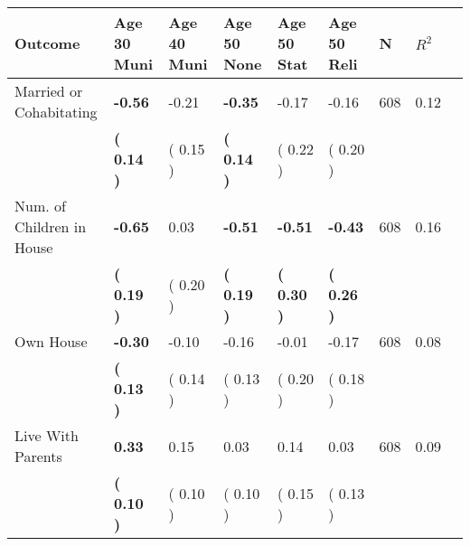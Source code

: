 \begin{tabular}{L{6.2cm} C{1.8cm} C{1.8cm} C{1.8cm} C{1.8cm} C{1.8cm} C{1.8cm} C{0.3cm} C{0.3cm}}
\toprule
 \textbf{Outcome} & \textbf{Age 30 Muni} & \textbf{Age 40 Muni} & \textbf{Age 50 None} & \textbf{Age 50 Stat} & \textbf{Age 50 Reli} & \textbf{N} & \textbf{$ R^2$} \\
\midrule
Married or Cohabitating & \textbf{    -0.56} &     -0.21 & \textbf{    -0.35} &     -0.17 &     -0.16  & 608 &       0.12 \\ 
 & \textbf{(     0.14 )} & (     0.15 ) & \textbf{(     0.14 )} & (     0.22 ) & (     0.20 )  & \\
Num. of Children in House & \textbf{    -0.65} &      0.03 & \textbf{    -0.51} & \textbf{    -0.51} & \textbf{    -0.43}  & 608 &       0.16 \\ 
 & \textbf{(     0.19 )} & (     0.20 ) & \textbf{(     0.19 )} & \textbf{(     0.30 )} & \textbf{(     0.26 )}  & \\
Own House & \textbf{    -0.30} &     -0.10 &     -0.16 &     -0.01 &     -0.17  & 608 &       0.08 \\ 
 & \textbf{(     0.13 )} & (     0.14 ) & (     0.13 ) & (     0.20 ) & (     0.18 )  & \\
Live With Parents & \textbf{     0.33} &      0.15 &      0.03 &      0.14 &      0.03  & 608 &       0.09 \\ 
 & \textbf{(     0.10 )} & (     0.10 ) & (     0.10 ) & (     0.15 ) & (     0.13 )  & \\
\bottomrule
\end{tabular}
